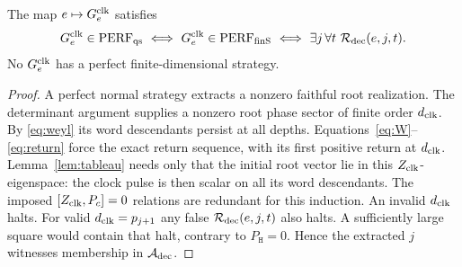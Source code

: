 \begin{theorem}\label{thm:reduction}
The map $e\mapsto G^{\rm clk}_e$ satisfies
\[
 G^{\rm clk}_e\in\mathrm{PERF}_{\mathrm{qs}}\ \Longleftrightarrow\
 G^{\rm clk}_e\in\mathrm{PERF}_{\mathrm{finS}}\ \Longleftrightarrow\
 \exists j\,\forall t\ \mathcal R_{\rm dec}(e,j,t).
\]
No $G^{\rm clk}_e$ has a perfect finite-dimensional strategy.
\end{theorem}
\begin{proof}
A perfect normal strategy extracts a nonzero faithful root realization. The determinant argument supplies a nonzero root phase sector of finite order ${d_{\rm clk}}$. By \eqref{eq:weyl} its word descendants persist at all depths. Equations~\eqref{eq:W}--\eqref{eq:return} force the exact return sequence, with its first positive return at ${d_{\rm clk}}$. Lemma~\ref{lem:tableau} needs only that the initial root vector lie in this $Z_{\rm clk}$-eigenspace: the clock pulse is then scalar on all its word descendants. The imposed $[Z_{\rm clk},P_c]=0$ relations are redundant for this induction. An invalid ${d_{\rm clk}}$ halts. For valid ${d_{\rm clk}}=p_{j+1}$ any false $\mathcal R_{\rm dec}(e,j,t)$ also halts. A sufficiently large square would contain that halt, contrary to $P_{\mathtt H}=0$. Hence the extracted $j$ witnesses membership in $\mathcal A_{\rm dec}$.


\end{proof}
